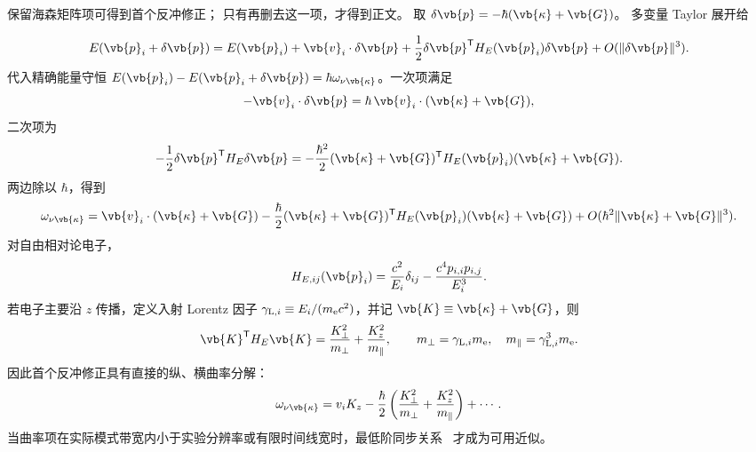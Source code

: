 \begin{derivation}
保留海森矩阵项可得到首个反冲修正； 只有再删去这一项，才得到正文。 取
$\delta\vb{p}=-\hbar(\vb{\kappa}+\vb{G})$。 多变量 Taylor 展开给

\[
E(\vb{p}_i+\delta\vb{p})
=E(\vb{p}_i)+\vb{v}_i\cdot\delta\vb{p}
+\frac12\delta\vb{p}^{\mathsf T}H_E(\vb{p}_i)\delta\vb{p}
+O(\|\delta\vb{p}\|^3).
\]
代入精确能量守恒
$E(\vb{p}_i)-E(\vb{p}_i+\delta\vb{p})=\hbar\omega_{\nu\vb{\kappa}}$。一次项满足
\[
-\vb{v}_i\cdot\delta\vb{p}
=\hbar\,\vb{v}_i\cdot(\vb{\kappa}+\vb{G}),
\]
二次项为
\[
-\frac12\delta\vb{p}^{\mathsf T}H_E\delta\vb{p}
=-\frac{\hbar^2}{2}(\vb{\kappa}+\vb{G})^{\mathsf T}
H_E(\vb{p}_i)(\vb{\kappa}+\vb{G}).
\]
两边除以 $\hbar$，得到
\[
\omega_{\nu\vb{\kappa}}
=\vb{v}_i\cdot(\vb{\kappa}+\vb{G})
-\frac{\hbar}{2}(\vb{\kappa}+\vb{G})^{\mathsf T}
H_E(\vb{p}_i)(\vb{\kappa}+\vb{G})
+O(\hbar^2\|\vb{\kappa}+\vb{G}\|^3).
\]
对自由相对论电子，
\[
H_{E,ij}(\vb{p}_i)
=\frac{c^2}{E_i}\delta_{ij}
-\frac{c^4p_{i,i}p_{i,j}}{E_i^3}.
\]
若电子主要沿 $z$ 传播，定义入射 Lorentz 因子 $\gamma_{{\rm L},i}\equiv E_i/(m_{\mathrm e} c^2)$，并记 $\vb{K}\equiv\vb{\kappa}+\vb{G}$，则
\[
\vb{K}^{\mathsf T}H_E\vb{K}
=\frac{K_\perp^2}{m_\perp}+\frac{K_z^2}{m_\parallel},
\qquad
m_\perp=\gamma_{{\rm L},i}m_{\mathrm e},
\quad
m_\parallel=\gamma_{{\rm L},i}^3m_{\mathrm e}.
\]
因此首个反冲修正具有直接的纵、横曲率分解：
\[
\omega_{\nu\vb{\kappa}}
=v_iK_z-
\frac{\hbar}{2}
\left(\frac{K_\perp^2}{m_\perp}+\frac{K_z^2}{m_\parallel}\right)+\cdots.
\]
当曲率项在实际模式带宽内小于实验分辨率或有限时间线宽时，最低阶同步关系~ 才成为可用近似。
\end{derivation}

